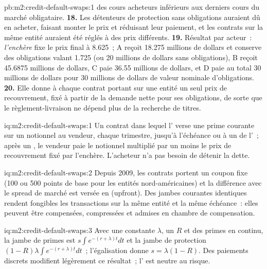 \begin{solution}{pb:m2:credit-default-swaps:1}
des cours acheteurs inférieurs aux derniers cours du marché obligataire.
\textbf{18.} Les détenteurs de protection sans obligations auraient dû en acheter, faisant monter le
prix et réduisant leur paiement, et les contrats sur la même entité auraient été réglés à
des prix différents.
\textbf{19.} Résultat par acteur~: \emph{l'enchère} fixe le prix final à 8.625~; A reçoit
18.275 millions de dollars et conserve des obligations valant 1.725 (ou 20 millions de dollars sans obligations), B
reçoit 45.6875 millions de dollars, C paie 36.55 millions de dollars, et D paie au total 30 millions de dollars
pour 30 millions de dollars de valeur nominale d'obligations.
\textbf{20.} Elle donne à chaque contrat portant sur une entité un seul prix de recouvrement, fixé à partir de la
demande nette pour ses obligations, de sorte que le règlement-livraison ne dépend plus de la recherche de titres.
\end{solution}

\begin{solution}{iq:m2:credit-default-swaps:1}
Un contrat dans lequel l' verse une prime courante sur un notionnel au
vendeur, chaque trimestre, jusqu'à l'échéance ou à un  de l'~; après un
, le vendeur paie le notionnel multiplié par un moins le prix de recouvrement fixé par
l'enchère. L'acheteur n'a pas besoin de détenir la dette.
\end{solution}

\begin{solution}{iq:m2:credit-default-swaps:2}
Depuis 2009, les contrats portent un coupon fixe (100 ou 500 points de base pour les
entités nord-américaines) et la différence avec le spread de marché est versée en  (upfront). Des jambes courantes
identiques rendent fongibles les transactions sur la même entité et la même échéance~: elles peuvent être compensées,
compressées et admises en chambre de compensation.
\end{solution}

\begin{solution}{iq:m2:credit-default-swaps:3}
Avec une  constante $\lambda$, un  $R$ et des primes en continu, la jambe de primes est
$s\int e^{-(r+\lambda)t}dt$ et la jambe de protection $(1-R)\lambda\int
e^{-(r+\lambda)t}dt$~; l'égalisation donne $s = \lambda(1-R)$. Des paiements discrets
modifient légèrement ce résultat~; l' est neutre au risque.
\end{solution}

